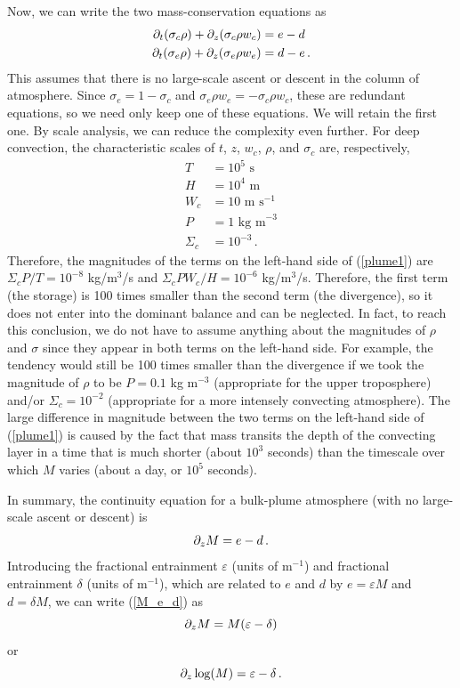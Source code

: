 \documentclass[12pt]{article}
\begin{document}
Now, we can write the two mass-conservation equations as
\begin{align}
\partial_t (\sigma_c \rho) + \partial_z (\sigma_c \rho w_c) &= e - d \label{plume1} \\
\partial_t (\sigma_e \rho) + \partial_z (\sigma_e \rho w_e) &= d - e \, .
\end{align}
This assumes that there is no large-scale ascent or descent in the column of atmosphere.  Since $\sigma_e = 1 - \sigma_c$ and $\sigma_e\rho w_e = -\sigma_c \rho w_c$, these are redundant equations, so we need only keep one of these equations.  We will retain the first one.  By scale analysis, we can reduce the complexity even further.  For deep convection, the characteristic scales of $t$, $z$, $w_c$, $\rho$, and $\sigma_c$ are, respectively,
\begin{align}
T &= 10^5 \text{ s} \\
H &= 10^4 \text{ m} \\
W_c &= 10 \text{ m s}^{-1} \\
P &= 1 \text{ kg m}^{-3} \\
\Sigma_c &= 10^{-3} \, .
\end{align}
Therefore, the magnitudes of the terms on the left-hand side of (\ref{plume1}) are $\Sigma_c P / T = 10^{-8}$ kg/m$^3$/s and $\Sigma_c P W_c/H = 10^{-6}$ kg/m$^3$/s.  Therefore, the first term (the storage) is 100 times smaller than the second term (the divergence), so it does not enter into the dominant balance and can be neglected.  In fact, to reach this conclusion, we do not have to assume anything about the magnitudes of $\rho$ and $\sigma$ since they appear in both terms on the left-hand side.  For example, the tendency would still be 100 times smaller than the divergence if we took the magnitude of $\rho$ to be $P = 0.1$ kg m$^{-3}$ (appropriate for the upper troposphere) and/or $\Sigma_c = 10^{-2}$ (appropriate for a more intensely convecting atmosphere).  The large difference in magnitude between the two terms on the left-hand side of (\ref{plume1}) is caused by the fact that mass transits the depth of the convecting layer in a time that is much shorter (about $10^3$ seconds) than the timescale over which $M$ varies (about a day, or $10^5$ seconds).


In summary, the continuity equation for a bulk-plume atmosphere (with no large-scale ascent or descent) is
\begin{equation}
\partial_z M = e - d \, . \label{M_e_d}
\end{equation}
Introducing the fractional entrainment $\varepsilon$ (units of m$^{-1}$) and fractional entrainment $\delta$ (units of m$^{-1}$), which are related to $e$ and $d$ by $e = \varepsilon M$ and $d = \delta M$, we can write (\ref{M_e_d}) as
\[
\partial_z M = M (\varepsilon - \delta)
\]
or
\[
\partial_z \log(M) = \varepsilon - \delta \, .
\]
\end{document}
